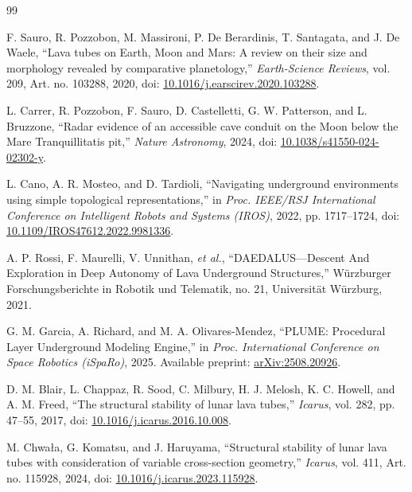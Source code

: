 \begin{thebibliography}{99}

F. Sauro, R. Pozzobon, M. Massironi, P. De Berardinis, T. Santagata, and J. De Waele,
``Lava tubes on Earth, Moon and Mars: A review on their size and morphology revealed by comparative planetology,''
\emph{Earth-Science Reviews}, vol. 209, Art. no. 103288, 2020,
doi: \href{https://doi.org/10.1016/j.earscirev.2020.103288}{10.1016/j.earscirev.2020.103288}.

L. Carrer, R. Pozzobon, F. Sauro, D. Castelletti, G. W. Patterson, and L. Bruzzone,
``Radar evidence of an accessible cave conduit on the Moon below the Mare Tranquillitatis pit,''
\emph{Nature Astronomy}, 2024,
doi: \href{https://doi.org/10.1038/s41550-024-02302-y}{10.1038/s41550-024-02302-y}.

L. Cano, A. R. Mosteo, and D. Tardioli,
``Navigating underground environments using simple topological representations,''
in \emph{Proc. IEEE/RSJ International Conference on Intelligent Robots and Systems (IROS)},
2022, pp. 1717--1724,
doi: \href{https://doi.org/10.1109/IROS47612.2022.9981336}{10.1109/IROS47612.2022.9981336}.

A. P. Rossi, F. Maurelli, V. Unnithan, \emph{et al.},
``DAEDALUS---Descent And Exploration in Deep Autonomy of Lava Underground Structures,''
W\"urzburger Forschungsberichte in Robotik und Telematik, no. 21,
Universit\"at W\"urzburg, 2021.

G. M. Garcia, A. Richard, and M. A. Olivares-Mendez,
``PLUME: Procedural Layer Underground Modeling Engine,''
in \emph{Proc. International Conference on Space Robotics (iSpaRo)}, 2025.
Available preprint: \href{https://arxiv.org/abs/2508.20926}{arXiv:2508.20926}.

D. M. Blair, L. Chappaz, R. Sood, C. Milbury, H. J. Melosh, K. C. Howell, and A. M. Freed,
``The structural stability of lunar lava tubes,''
\emph{Icarus}, vol. 282, pp. 47--55, 2017,
doi: \href{https://doi.org/10.1016/j.icarus.2016.10.008}{10.1016/j.icarus.2016.10.008}.

M. Chwa\l{}a, G. Komatsu, and J. Haruyama,
``Structural stability of lunar lava tubes with consideration of variable cross-section geometry,''
\emph{Icarus}, vol. 411, Art. no. 115928, 2024,
doi: \href{https://doi.org/10.1016/j.icarus.2023.115928}{10.1016/j.icarus.2023.115928}.


\end{thebibliography}
